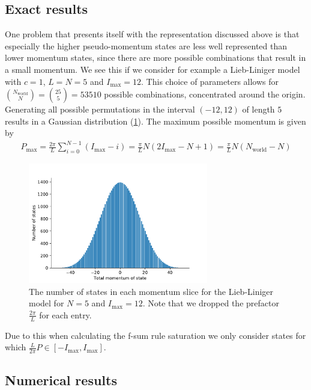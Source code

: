 \documentclass[11pt, a4paper]{report} %
\begin{document}
\subsection{Exact results}\label{sec:exact}

One problem that presents itself with the representation discussed above is that especially the higher pseudo-momentum states are less well represented than lower momentum states, since there are more possible combinations that result in a small momentum.
We see this if we consider for example a Lieb-Liniger model with \(c=1\), \(L=N=5\) and \(I_{\max} =12\).
This choice of parameters allows for \(\binom{N_{\mathrm{world}}}{N}=\binom{25}{5}=53510\) possible combinations, concentrated around the origin.
Generating all possible permutations in the interval \((-12, 12)\) of length \(5\) results in a Gaussian distribution (\cref{fig:no_of_states}).
The maximum possible momentum is given by
\begin{align}
  \label{eq:50}
  P_{\max} = \frac{2\pi}{L}\sum_{i=0}^{N-1}(I_{\max}-i) = \frac{\pi}{L}N (2 I_{\max} -N +1) = \frac{\pi}{L}N (N_{\mathrm{world}} -N)
\end{align}

\begin{figure}[tb!]
  \centering
  \includegraphics[width=0.7\textwidth]{no_of_states}
  \caption{The number of states in each momentum slice for the Lieb-Liniger model for \(N=5\) and \(I_{\max}=12\). Note that we dropped the prefactor \(\frac{2\pi}{L}\) for each entry.}
  \label{fig:no_of_states}
\end{figure}

Due to this when calculating the f-sum rule saturation we only consider states for which \(\frac{L}{2\pi}P \in [-I_{\max},I_{\max}]\).






\subsection{Numerical results}
\end{document}

